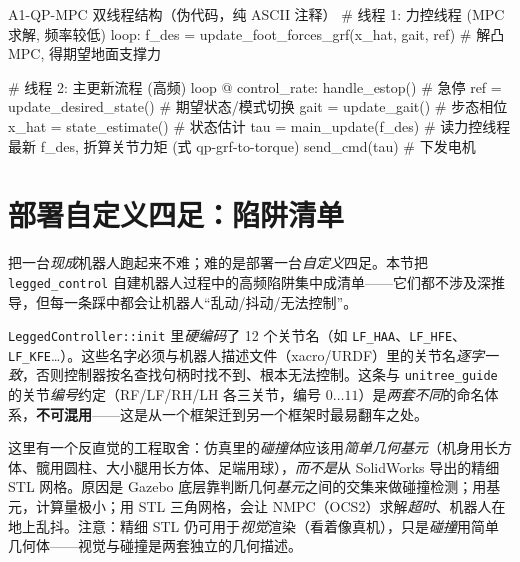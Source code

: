\begin{codebox}[text]{A1-QP-MPC 双线程结构（伪代码，纯 ASCII 注释）}
# 线程 1: 力控线程 (MPC 求解, 频率较低)
loop:
    f_des = update_foot_forces_grf(x_hat, gait, ref)   # 解凸 MPC, 得期望地面支撑力

# 线程 2: 主更新流程 (高频)
loop @ control_rate:
    handle_estop()                  # 急停
    ref   = update_desired_state()  # 期望状态/模式切换
    gait  = update_gait()           # 步态相位
    x_hat = state_estimate()        # 状态估计
    tau   = main_update(f_des)      # 读力控线程最新 f_des, 折算关节力矩 (式 qp-grf-to-torque)
    send_cmd(tau)                   # 下发电机
\end{codebox}

\section{部署自定义四足：陷阱清单}
\label{sec:qp-pitfalls}

把一台\emph{现成}机器人跑起来不难；难的是部署一台\emph{自定义}四足。本节把 \texttt{legged\_control} 自建机器人过程中的高频陷阱集中成清单——它们都不涉及深推导，但每一条踩中都会让机器人“乱动/抖动/无法控制”。

\begin{pitfall}[关节名称硬编码必须完全一致]\label{pit:qp-jointname}
\texttt{LeggedController::init} 里\emph{硬编码}了 12 个关节名（如 \texttt{LF\_HAA}、\texttt{LF\_HFE}、\texttt{LF\_KFE}\dots）。这些名字必须与机器人描述文件（xacro/URDF）里的关节名\emph{逐字一致}，否则控制器按名查找句柄时找不到、根本无法控制\cite{sleiman2021unified}。这条与 \texttt{unitree\_guide} 的关节\emph{编号}约定（RF/LF/RH/LH 各三关节，编号 $0\!\dots\!11$）是\emph{两套不同}的命名体系，\textbf{不可混用}——这是从一个框架迁到另一个框架时最易翻车之处。
\end{pitfall}

\begin{insight}\label{ins:qp-collision}
这里有一个反直觉的工程取舍：仿真里的\emph{碰撞体}应该用\emph{简单几何基元}（机身用长方体、髋用圆柱、大小腿用长方体、足端用球），\emph{而不是}从 SolidWorks 导出的精细 STL 网格。原因是 Gazebo 底层靠判断几何\emph{基元}之间的交集来做碰撞检测；用基元，计算量极小；用 STL 三角网格，会让 NMPC（OCS2）求解\emph{超时}、机器人在地上乱抖\cite{sleiman2021unified}。注意：精细 STL 仍可用于\emph{视觉}渲染（看着像真机），只是\emph{碰撞}用简单几何体——视觉与碰撞是两套独立的几何描述。
\end{insight}

